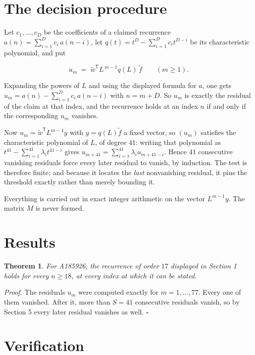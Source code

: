 \documentclass[11pt]{article}
\newtheorem{theorem}{Theorem}
\theoremstyle{definition}
\begin{document}
\section{The decision procedure}

Let $c_1,\dots,c_D$ be the coefficients of a claimed recurrence $a(n) = \sum_{i=1}^{D} c_i\,a(n-i)$, let $q(t) = t^{D} - \sum_{i=1}^{D} c_i t^{D-i}$ be its characteristic polynomial, and put

\[u_m \;=\; \tilde w^{\mathsf T} L^{\,m-1} q(L)\,\tilde f \qquad (m \ge 1).\]

Expanding the powers of $L$ and using the displayed formula for $a$, one gets $u_m = a(n) - \sum_{i=1}^{D} c_i\,a(n-i)$ with $n = m + D$. So $u_m$ is exactly the residual of the claim at that index, and the recurrence holds at an index $n$ if and only if the corresponding $u_m$ vanishes.

Now $u_m = \tilde w^{\mathsf T} L^{m-1} y$ with $y = q(L)\tilde f$ a fixed vector, so $(u_m)$ satisfies the characteristic polynomial of $L$, of degree $41$: writing that polynomial as $t^{41} - \sum_{i=1}^{41} \lambda_i t^{41-i}$ gives $u_{m+41} = \sum_{i=1}^{41} \lambda_i u_{m+41-i}$. Hence $41$ consecutive vanishing residuals force every later residual to vanish, by induction. The test is therefore finite; and because it locates the {\itshape last} nonvanishing residual, it pins the threshold exactly rather than merely bounding it.

Everything is carried out in exact integer arithmetic on the vector $L^{m-1}y$. The matrix $M$ is never formed.

\section{Results}

\begin{theorem} For A185926, the recurrence of order $17$ displayed in Section 1 holds for every $n \ge 18$, at every index at which it can be stated.\end{theorem}

{\itshape Proof.} The residuals $u_m$ were computed exactly for $m = 1,\dots,77$. Every one of them vanished. After it, more than $S = 41$ consecutive residuals vanish, so by Section 5 every later residual vanishes as well. $\square$

\section{Verification}
\end{document}
